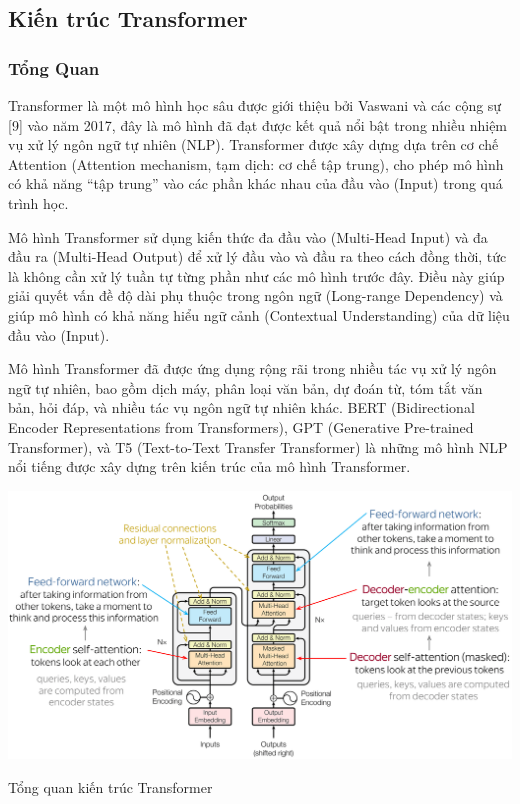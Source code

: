 \documentclass[a4paper, 12pt, openany]{book}
\begin{document}
\subsection{Kiến trúc Transformer}
\subsubsection{Tổng Quan}

Transformer\cite{Wolf2019HuggingFacesTS} là một mô hình học sâu được giới thiệu bởi Vaswani và các cộng sự [9]
vào năm 2017, đây là mô hình đã đạt được kết quả nổi bật trong nhiều nhiệm vụ xử lý
ngôn ngữ tự nhiên (NLP). Transformer được xây dựng dựa trên cơ chế Attention
(Attention mechanism, tạm dịch: cơ chế tập trung), cho phép mô hình có khả năng “tập
trung” vào các phần khác nhau của đầu vào (Input) trong quá trình học.

Mô hình Transformer sử dụng kiến thức đa đầu vào (Multi-Head Input) và đa đầu
ra (Multi-Head Output) để xử lý đầu vào và đầu ra theo cách đồng thời, tức là không cần
xử lý tuần tự từng phần như các mô hình trước đây. Điều này giúp giải quyết vấn đề độ
dài phụ thuộc trong ngôn ngữ (Long-range Dependency) và giúp mô hình có khả năng
hiểu ngữ cảnh (Contextual Understanding) của dữ liệu đầu vào (Input).

Mô hình Transformer đã được ứng dụng rộng rãi trong nhiều tác vụ xử lý ngôn ngữ
tự nhiên, bao gồm dịch máy, phân loại văn bản, dự đoán từ, tóm tắt văn bản, hỏi đáp, và
nhiều tác vụ ngôn ngữ tự nhiên khác. BERT\cite{BERT} (Bidirectional Encoder Representations from
Transformers), GPT\cite{yenduri2023generative} (Generative Pre-trained Transformer), và T5\cite{raffel2023exploring} (Text-to-Text Transfer
Transformer) là những mô hình NLP nổi tiếng được xây dựng trên kiến trúc của mô hình
Transformer.

\begin{minipage}{\linewidth}
    \captionsetup{type=figure}
    \centering
    \includegraphics[width=\linewidth]{./assets/images/transformer.png}
    \caption{Tổng quan kiến trúc Transformer\cite{vaswani2023attention}}
\end{minipage}
\end{document}
